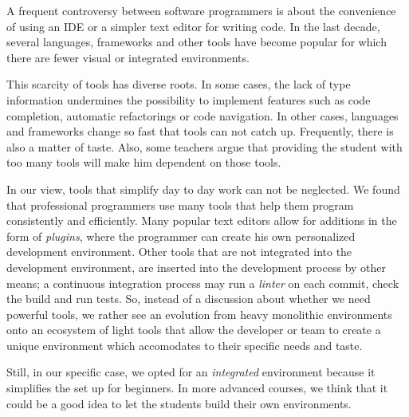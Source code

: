 A frequent controversy between software programmers is about the convenience of using an IDE or a simpler text editor for writing code. In the last decade, several languages, frameworks and other tools have become popular for which there are fewer visual or integrated environments. 

This scarcity of tools has diverse roots. In some cases, the lack of type information undermines the possibility to implement features such as code completion, automatic refactorings or code navigation.
In other cases, languages and frameworks change so fast that tools can not catch up.
Frequently, there is also a matter of taste.
Also, some teachers argue that providing the student with too many tools will make him dependent on those tools.

In our view, tools that simplify day to day work can not be neglected. 
We found that professional programmers use many tools that help them 
program consistently and efficiently.
Many popular text editors allow for additions in the form of \emph{plugins}, 
where the programmer can create his own personalized development environment.
Other tools that are not integrated into the development environment, 
are inserted into the development process by other means; 
\eg a continuous integration process may run a \emph{linter} on each commit, check the build and run tests.
So, instead of a discussion about whether we need powerful tools, we rather see an evolution from heavy monolithic environments
onto an ecosystem of light tools that allow the developer or team to create a unique environment 
which accomodates to their specific needs and taste. 

Still, in our specific case, we opted for an \emph{integrated} environment because it simplifies the set up for beginners. 
In more advanced courses, we think that it could be a good idea to let the students build their own environments.

